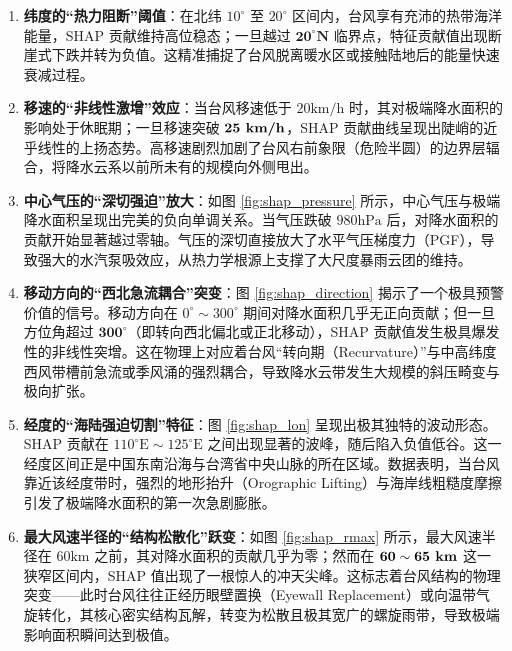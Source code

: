 \documentclass[12pt,a4paper]{ctexart}
\begin{document}
\begin{enumerate}
    \item \textbf{纬度的“热力阻断”阈值}：在北纬 $10^{\circ}$ 至 $20^{\circ}$ 区间内，台风享有充沛的热带海洋能量，SHAP 贡献维持高位稳态；一旦越过 $\textbf{20}^{\circ}\textbf{N}$ 临界点，特征贡献值出现断崖式下跌并转为负值。这精准捕捉了台风脱离暖水区或接触陆地后的能量快速衰减过程。
    
    \item \textbf{移速的“非线性激增”效应}：当台风移速低于 $20 \text{km/h}$ 时，其对极端降水面积的影响处于休眠期；一旦移速突破 $\textbf{25 \text{km/h}}$，SHAP 贡献曲线呈现出陡峭的近乎线性的上扬态势。高移速剧烈加剧了台风右前象限（危险半圆）的边界层辐合，将降水云系以前所未有的规模向外侧甩出。
    
    \item \textbf{中心气压的“深切强迫”放大}：如图 \ref{fig:shap_pressure} 所示，中心气压与极端降水面积呈现出完美的负向单调关系。当气压跌破 $980 \text{hPa}$ 后，对降水面积的贡献开始显著越过零轴。气压的深切直接放大了水平气压梯度力（PGF），导致强大的水汽泵吸效应，从热力学根源上支撑了大尺度暴雨云团的维持。
    
    \item \textbf{移动方向的“西北急流耦合”突变}：图 \ref{fig:shap_direction} 揭示了一个极具预警价值的信号。移动方向在 $0^{\circ} \sim 300^{\circ}$ 期间对降水面积几乎无正向贡献；但一旦方位角超过 $\textbf{300}^{\circ}$（即转向西北偏北或正北移动），SHAP 贡献值发生极具爆发性的非线性突增。这在物理上对应着台风“转向期（Recurvature）”与中高纬度西风带槽前急流或季风涌的强烈耦合，导致降水云带发生大规模的斜压畸变与极向扩张。
    
    \item \textbf{经度的“海陆强迫切割”特征}：图 \ref{fig:shap_lon} 呈现出极其独特的波动形态。SHAP 贡献在 $110^{\circ}\text{E} \sim 125^{\circ}\text{E}$ 之间出现显著的波峰，随后陷入负值低谷。这一经度区间正是中国东南沿海与台湾省中央山脉的所在区域。数据表明，当台风靠近该经度带时，强烈的地形抬升（Orographic Lifting）与海岸线粗糙度摩擦引发了极端降水面积的第一次急剧膨胀。
    
    \item \textbf{最大风速半径的“结构松散化”跃变}：如图 \ref{fig:shap_rmax} 所示，最大风速半径在 $60 \text{km}$ 之前，其对降水面积的贡献几乎为零；然而在 $\textbf{60} \sim \textbf{65 \text{km}}$ 这一狭窄区间内，SHAP 值出现了一根惊人的冲天尖峰。这标志着台风结构的物理突变——此时台风往往正经历眼壁置换（Eyewall Replacement）或向温带气旋转化，其核心密实结构瓦解，转变为松散且极其宽广的螺旋雨带，导致极端影响面积瞬间达到极值。
\end{enumerate}
\end{document}
